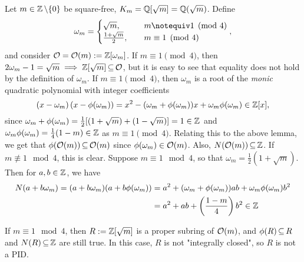 \documentclass[11pt]{book}
\theoremstyle{definition}   \newtheorem{defn}[counter]{Definition} %
\newcommand{\bs}{\backslash}   \newcommand{\A}{\mathcal{A}}   \newcommand{\sy}{\textnormal{Syl}}   \newcommand{\size}[1]{\left| #1 \right|}
\newcommand{\vs}{\vspace{8pt}}
\numberwithin{counter}{chapter}
\begin{document}
\begin{remark}
Let $m \in \z\bs\{0\}$ be square-free, $K_m = \operatorname{\mathbb{Q}}[\sqrt{m}] = \operatorname{\mathbb{Q}}(\sqrt{m})$. Define
	\[\omega_m = \begin{cases}
					\sqrt{m}, \qquad & m \notequiv 1 \pmod{4} \\
					\frac{1+\sqrt{m}}{2},   & m \equiv 1 \pmod{4}
	\end{cases},\]
and consider $\mathcal{O} = \mathcal{O}(m) := \operatorname{\mathbb{Z}}[\omega_m]$. If $m \equiv 1 \pmod{4}$, then $2\omega_m-1 = \sqrt{m} \implies \operatorname{\mathbb{Z}}[\sqrt{m}] \operatorname{\subseteq} \mathcal{O}$, but it is easy to see that equality does not hold by the definition of $\omega_m$. If $m \equiv 1 \pmod{4}$, then $\omega_m$ is a root of the \emph{monic} quadratic polynomial with integer coefficients
\[\left(x-\omega_m\right)(x-\phi(\omega_m)) = x^2 - (\omega_m + \phi(\omega_m))x + \omega_m\phi(\omega_m) \in \operatorname{\mathbb{Z}}[x], \]
since $\omega_m + \phi(\omega_m) = \frac{1}{2} [(1+\sqrt{m})+(1-\sqrt{m})] = 1 \in \operatorname{\mathbb{Z}}$ and $\omega_m \phi(\omega_m) = \frac{1}{4}(1-m) \in \operatorname{\mathbb{Z}}$ as $m \equiv 1 \pmod{4}$.  Relating this to the above lemma, we get that $\phi(\mathcal{O}(m)) \operatorname{\subseteq} \mathcal{O}(m)$ since $\phi(\omega_m) \in \mathcal{O}(m)$. Also, $N(\mathcal{O}(m)) \operatorname{\subseteq} \operatorname{\mathbb{Z}}$. If $m \not\equiv 1 \mod 4$, this is clear. Suppose $m \equiv 1 \mod{4}$, so that $\omega_m = \frac{1}{2}(1+\sqrt{m})$. Then for $a,b \in \operatorname{\mathbb{Z}}$, we have
\begin{align*}
N(a+b\omega_m) = (a+b\omega_m) (a+b\phi(\omega_m)) &= a^2 + (\omega_m + \phi(\omega_m))ab + \omega_m \phi(\omega_m) b^2 \\
&= a^2 + ab + \left(\frac{1-m}{4}\right) b^2 \in \operatorname{\mathbb{Z}}
\end{align*}
\end{remark}

\vs

\begin{remark}
If $m \equiv 1 \mod{4}$, then $R := \operatorname{\mathbb{Z}}[\sqrt{m}]$ is a proper subring of $\mathcal{O}(m)$, and $\phi(R) \operatorname{\subseteq} R$ and $N(R) \operatorname{\subseteq} \operatorname{\mathbb{Z}}$ are still true. In this case, $R$ is not "integrally closed", so $R$ is not a PID.
\end{remark}

\vs
\end{document}
